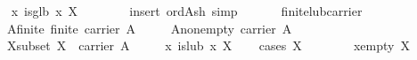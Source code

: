 \begin{isabellebody}
\ \ \ \ \isamarkupfalse%
\ {}{}x{}\ is{}glb\ x\ X{}\isanewline
\ \ \ \ \ \ \isamarkupfalse%
\ {}insert\ ord{}Ash{}\ simp{}\isanewline
\ \ \isamarkupfalse%
%
\endisatagproof
{\isafoldproof}%
%
\isadelimproof
\isanewline
%
\endisadelimproof
\isanewline
\ \ \isamarkupfalse%
\ finite{}lub{}carrier{}\isanewline
\ \ \ \ \ A{}finite{}\ {}finite\ {}carrier\ A{}{}\isanewline
\ \ \ \ \ A{}non{}empty{}\ {}carrier\ A\ {}\ {}{}{}\isanewline
\ \ \ \ \ X{}subset{}\ {}X\ {}\ carrier\ A{}\isanewline
\ \ \ \ \ {}{}x{}\ is{}lub\ x\ X{}\isanewline
%
\isadelimproof
\ \ %
\endisadelimproof
%
\isatagproof
{}\isamarkupfalse%
\ {}cases\ {}X\ {}\ {}{}{}{}\isanewline
\ \ \ \ \isamarkupfalse%
\ x{}empty{}\ {}X\ {}\ {}{}{}\isanewline

\end{isabellebody}
